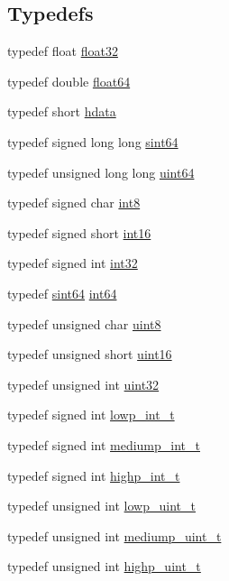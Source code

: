 \subsection*{Typedefs}
\begin{DoxyCompactItemize}
\item 
typedef float \hyperlink{namespaceglm_1_1detail_ad60558c5c304624de0b54c51b5857737}{float32}
\item 
typedef double \hyperlink{namespaceglm_1_1detail_a5a0a9a1be3fd5dbe6d47ae45c3022b06}{float64}
\item 
typedef short \hyperlink{namespaceglm_1_1detail_aa2115f7dd38e14fea7ba9e95104120f3}{hdata}
\item 
typedef signed long long \hyperlink{namespaceglm_1_1detail_aa9fd5478f3e347aa0b2d1a8bf3408544}{sint64}
\item 
typedef unsigned long long \hyperlink{namespaceglm_1_1detail_adec4b19bf4982125e122db2fe03c5810}{uint64}
\item 
typedef signed char \hyperlink{namespaceglm_1_1detail_a04b526a8d7a9b455602a0afa78c531e0}{int8}
\item 
typedef signed short \hyperlink{namespaceglm_1_1detail_a375938874ca4f0a0982ec6373b56117b}{int16}
\item 
typedef signed int \hyperlink{namespaceglm_1_1detail_a9f85b4efeca416cdcec2fd08939a2e17}{int32}
\item 
typedef \hyperlink{namespaceglm_1_1detail_aa9fd5478f3e347aa0b2d1a8bf3408544}{sint64} \hyperlink{namespaceglm_1_1detail_a5b1c3227ec636c24a0676746381adfc8}{int64}
\item 
typedef unsigned char \hyperlink{namespaceglm_1_1detail_aef2588f97d090cc19fbbe0c74fe17c8f}{uint8}
\item 
typedef unsigned short \hyperlink{namespaceglm_1_1detail_a47b2a7d006d187338e8031a352d1ce56}{uint16}
\item 
typedef unsigned int \hyperlink{namespaceglm_1_1detail_ade6cfbf377022aaa391af8cd50489222}{uint32}
\item 
typedef signed int \hyperlink{namespaceglm_1_1detail_a030a8128e369fc1f9c7982dc68a78ba7}{lowp\+\_\+int\+\_\+t}
\item 
typedef signed int \hyperlink{namespaceglm_1_1detail_aede0757f19204d1d44f716b3dd66d13c}{mediump\+\_\+int\+\_\+t}
\item 
typedef signed int \hyperlink{namespaceglm_1_1detail_a74c48e9deafcc33db998a4ee62da8d6e}{highp\+\_\+int\+\_\+t}
\item 
typedef unsigned int \hyperlink{namespaceglm_1_1detail_ad59c4581ad8ce0c3ef6146edaa7e15dc}{lowp\+\_\+uint\+\_\+t}
\item 
typedef unsigned int \hyperlink{namespaceglm_1_1detail_a98f572e92099cc1b5740f1ccf1c80f8d}{mediump\+\_\+uint\+\_\+t}
\item 
typedef unsigned int \hyperlink{namespaceglm_1_1detail_a994c05c8a976cc902a7cd193ad36bbba}{highp\+\_\+uint\+\_\+t}
\end{DoxyCompactItemize}

